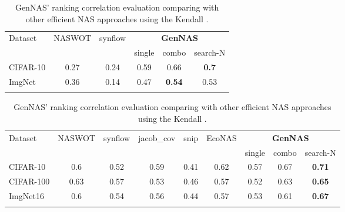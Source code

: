 \documentclass{article}
\begin{document}
\begin{table}[!h]
\vspace{-8pt}
\scriptsize
  \caption{GenNAS' ranking correlation evaluation comparing with other efficient NAS approaches using the Kendall .}
  \label{table:GenNAS_rankingcorrelation_tau}
  \centering
\setlength{\tabcolsep}{3pt}

\begin{tabular}{lccccc}
\Xhline{0.8pt}
\multicolumn{6}{l}{\textbf{NASBench-101}} \\ \hline
Dataset & NASWOT & synflow &  \multicolumn{3}{c}{\textbf{GenNAS}} \\\cline{4-6}
     & ~\cite{mellor2020neural} & ~\cite{abdelfattah2021zero} & single & combo & search-N \\\hline
CIFAR-10 & 0.27&	0.24&	0.59&	0.66	& \textbf{0.7}\\
ImgNet & 0.36&	0.14&	0.47&	\textbf{0.54}&	0.53 \\
\Xhline{0.8pt}
\vspace{-8pt}
\end{tabular}

\begin{tabular}{lccccc|ccc}
\Xhline{0.8pt}
\multicolumn{6}{l}{\textbf{NASBench-201}} \\ \hline
Dataset & NASWOT & synflow &jacob\_cov & snip  & EcoNAS & \multicolumn{3}{c}{\textbf{GenNAS}} \\\cline{7-9}
&&& &  &\cite{zhou2020econas}  & single & combo & search-N \\\hline
CIFAR-10 &  0.6&0.52&0.59&0.41&0.62&0.57&	0.67	&\textbf{0.71} \\
CIFAR-100 & 0.63	&0.57&	0.53&	0.46&	0.57&	0.52&	0.63	&\textbf{0.65} \\
ImgNet16 & 0.6&	0.54&	0.56&	0.44&	0.57&	0.53&	0.61	&\textbf{0.67} \\
\Xhline{0.8pt}
\end{tabular}


\end{table}
\end{document}
